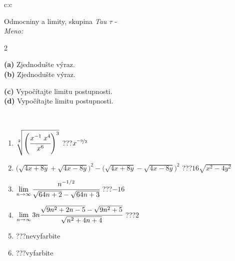 \documentclass[10pt]{report}
\begin{document}
\begin{tabular}{c:c}
\begin{minipage}[c][104.5mm][t]{0.5\linewidth}
\begin{center}
\vspace{7mm}
{\huge Odmocniny a limity, skupina \textit{Tau $\tau$} -}\\[5mm]
\textit{Meno:}\phantom{xxxxxxxxxxxxxxxxxxxxxxxxxxxxxxxxxxxxxxxxxxxxxxxxxxxxxxxxxxxxxxxxx}\\[5mm]
\begin{minipage}{0.95\linewidth}
\begin{center}
{\small \begin{multicols}{2} \raggedright
\textbf{(a)} Zjednodušte výraz. \\[1mm]
\textbf{(b)} Zjednodušte výraz. \par \columnbreak
\textbf{(c)} Vypočítajte limitu postupnosti. \\[1mm]
\textbf{(d)} Vypočítajte limitu postupnosti.
\end{multicols}
}
\end{center}
\end{minipage}
\\[4mm]
\begin{minipage}{0.79\linewidth}
\begin{center}
\begin{varwidth}{\linewidth}
\begin{enumerate}
\small
\item $\sqrt[2]{\left(\cfrac{x^{-1}\;x^{4}}{x^{6}}\right)^{3}}$\quad \dotfill\; ???\;\dotfill \quad $x^{\nicefrac{-9}{2}}$
\item {\footnotesize{\scriptsize$\big(\sqrt{4x+8y}+\sqrt{4x-8y}\big)^2-\big(\sqrt{4x+8y}-\sqrt{4x-8y}\big)^2$}\quad \dotfill\; ???\;\dotfill \quad $16\sqrt{x^2-4y^2}$}
\item $\lim\limits_{n\to\infty}\cfrac{n^{-1/2}}{\sqrt{64n+2}-\sqrt{64n+3}}$\quad \dotfill\; ???\;\dotfill \quad $-16$
\item $\lim\limits_{n\to\infty}3n\cfrac{\sqrt{9n^2+2n-5}-\sqrt{9n^2+5}}{\sqrt{n^2+4n+4}}$\quad \dotfill\; ???\;\dotfill \quad $2$
\item \quad \dotfill\; ???\;\dotfill \quad nevyfarbite
\item \quad \dotfill\; ???\;\dotfill \quad vyfarbite
\end{enumerate}
\end{varwidth}
\end{center}
\end{minipage}

\end{center}
\end{minipage}
\end{tabular}
\end{document}
